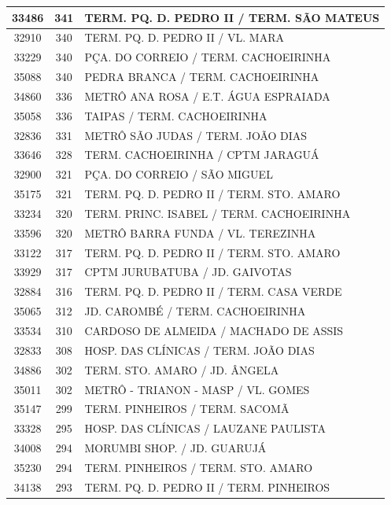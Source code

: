\documentclass[
	12pt,				%
	oneside,			%
	a4paper,			%
	english,			%
	brazil				%
	]{abntex2ppgsi}
\begin{document}
\begin{apendicesenv}
\begin{longtable}{c|c|p{7cm}}
\hline
    33486 & 341   & TERM. PQ. D. PEDRO II / TERM. SÃO MATEUS \\
\hline
    32910 & 340   & TERM. PQ. D. PEDRO II / VL. MARA \\
\hline
    33229 & 340   & PÇA. DO CORREIO / TERM. CACHOEIRINHA \\
\hline
    35088 & 340   & PEDRA BRANCA / TERM. CACHOEIRINHA \\
\hline
    34860 & 336   & METRÔ ANA ROSA / E.T. ÁGUA ESPRAIADA \\
\hline
    35058 & 336   & TAIPAS / TERM. CACHOEIRINHA \\
\hline
    32836 & 331   & METRÔ SÃO JUDAS / TERM. JOÃO DIAS \\
\hline
    33646 & 328   & TERM. CACHOEIRINHA / CPTM JARAGUÁ \\
\hline
    32900 & 321   & PÇA. DO CORREIO / SÃO MIGUEL \\
\hline
    35175 & 321   & TERM. PQ. D. PEDRO II / TERM. STO. AMARO \\
\hline
    33234 & 320   & TERM. PRINC. ISABEL / TERM. CACHOEIRINHA \\
\hline
    33596 & 320   & METRÔ BARRA FUNDA / VL. TEREZINHA \\
\hline
    33122 & 317   & TERM. PQ. D. PEDRO II / TERM. STO. AMARO \\
\hline
    33929 & 317   & CPTM JURUBATUBA / JD. GAIVOTAS \\
\hline
    32884 & 316   & TERM. PQ. D. PEDRO II / TERM. CASA VERDE \\
\hline
    35065 & 312   & JD. CAROMBÉ / TERM. CACHOEIRINHA \\
\hline
    33534 & 310   & CARDOSO DE ALMEIDA / MACHADO DE ASSIS \\
\hline
    32833 & 308   & HOSP. DAS CLÍNICAS / TERM. JOÃO DIAS \\
\hline
    34886 & 302   & TERM. STO. AMARO / JD. ÂNGELA \\
\hline
    35011 & 302   & METRÔ - TRIANON - MASP / VL. GOMES \\
\hline
    35147 & 299   & TERM. PINHEIROS / TERM. SACOMÃ \\
\hline
    33328 & 295   & HOSP. DAS CLÍNICAS / LAUZANE PAULISTA \\
\hline
    34008 & 294   & MORUMBI SHOP. / JD. GUARUJÁ \\
\hline
    35230 & 294   & TERM. PINHEIROS / TERM. STO. AMARO \\
\hline
    34138 & 293   & TERM. PQ. D. PEDRO II / TERM. PINHEIROS \\

\end{longtable}
\end{apendicesenv}
\end{document}

